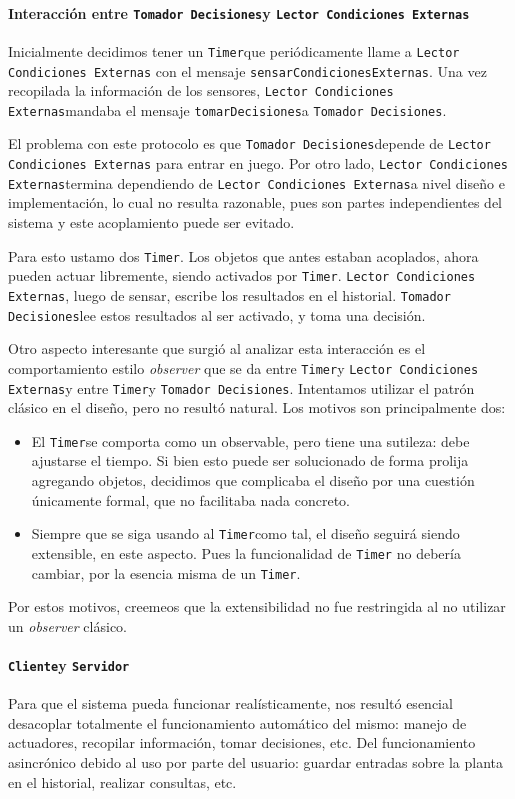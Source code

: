 \documentclass{article}
\newcommand{\condiciones}{\texttt{Lector Condiciones Externas}}
\newcommand{\sensarCondiciones}{\texttt{sensarCondicionesExternas}}
\newcommand{\decisiones}{\texttt{Tomador Decisiones}}
\newcommand{\tomarDecisiones}{\texttt{tomarDecisiones}}
\newcommand{\timer}{\texttt{Timer}}
\newcommand{\cliente}{\texttt{Cliente}}
\newcommand{\servidor}{\texttt{Servidor}}
\begin{document}
    \paragraph{Interacci\'on entre \decisiones y \condiciones}
    Inicialmente decidimos tener un \timer que peri\'odicamente llame a \condiciones
    con el mensaje \sensarCondiciones. Una vez recopilada la informaci\'on de los
    sensores, \condiciones mandaba el mensaje \tomarDecisiones a \decisiones.

    El problema con este protocolo es que \decisiones depende de \condiciones
    para entrar en juego. Por otro lado, \condiciones termina dependiendo de
    \condiciones a nivel dise\~no e implementaci\'on, lo cual no resulta razonable,
    pues son partes independientes del sistema y este acoplamiento puede ser evitado.

    Para esto ustamo dos \timer. Los objetos que antes estaban acoplados, ahora
    pueden actuar libremente, siendo activados por \timer. \condiciones, luego
    de sensar, escribe los resultados en el historial. \decisiones lee estos
    resultados al ser activado, y toma una decisi\'on.

    Otro aspecto interesante que surgi\'o al analizar esta interacci\'on es
    el comportamiento estilo \textit{observer} que se da entre \timer y
    \condiciones y entre \timer y \decisiones. Intentamos utilizar el patr\'on
    cl\'asico en el dise\~no, pero no result\'o natural. Los motivos son
    principalmente dos:
    \begin{itemize}
        \item El \timer se comporta como un observable, pero tiene una sutileza:
            debe ajustarse el tiempo. Si bien esto puede ser solucionado de
            forma prolija agregando objetos, decidimos que complicaba el dise\~no
            por una cuesti\'on \'unicamente formal, que no facilitaba nada
            concreto.
        \item Siempre que se siga usando al \timer como tal, el dise\~no seguir\'a
            siendo extensible, en este aspecto. Pues la funcionalidad de \timer
            no deber\'ia cambiar, por la esencia misma de un \timer.
    \end{itemize}
    Por estos motivos, creemeos que la extensibilidad no fue restringida al
    no utilizar un \textit{observer} cl\'asico.




    \paragraph{\cliente y \servidor}
    Para que el sistema pueda funcionar real\'isticamente, nos result\'o esencial
    desacoplar totalmente el funcionamiento autom\'atico del mismo: manejo de
    actuadores, recopilar informaci\'on, tomar decisiones, etc. Del funcionamiento
    asincr\'onico debido al uso por parte del usuario: guardar entradas sobre la
    planta en el historial, realizar consultas, etc.
\end{document}

